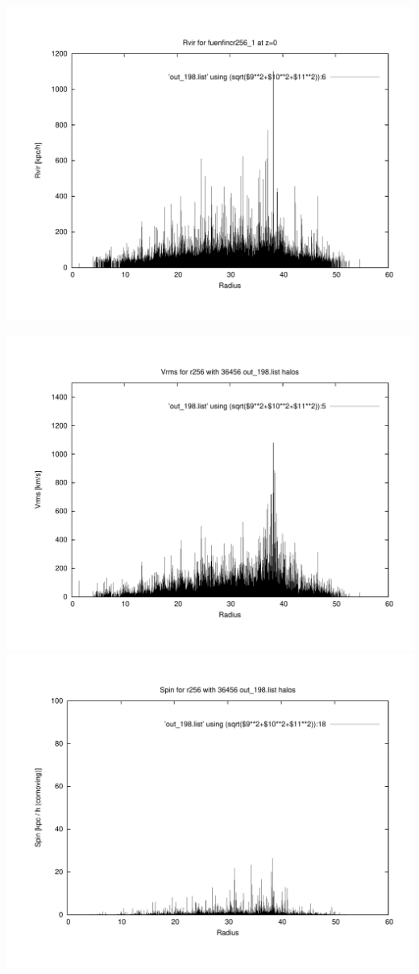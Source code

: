 \includegraphics[scale=0.3]{fuenfincr256_1/plot_rvir_z0.pdf}

\includegraphics[scale=0.3]{fuenfincr256_1/plot_Vrms_out_198.pdf}
\includegraphics[scale=0.3]{fuenfincr256_1/plot_spin_out_198.pdf}

